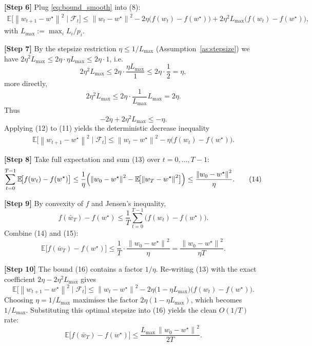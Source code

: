 \documentclass{article}
\newcommand{\E}{\mathbb{E}}
\newcommand{\norm}[1]{\left\lVert#1\right\rVert}
\begin{document}
\noindent\textbf{[Step 6]}  Plug \eqref{eq:bound_smooth} into (8):
\begin{align}
\E\!\bigl[\norm{w_{t+1}-w^{\star}}^{2}\mid\mathcal{F}_t\bigr]
\le
\norm{w_t-w^{\star}}^{2}
-2\eta\bigl(f(w_t)-f(w^{\star})\bigr)
+2\eta^{2}L_{\max}\bigl(f(w_t)-f(w^{\star})\bigr),
\tag{11}
\end{align}
with $L_{\max}:=\max_i L_i/p_i$.

\noindent\textbf{[Step 7]}  By the stepsize restriction $\eta\le 1/L_{\max}$ (Assumption~\ref{as:stepsize}) we have $2\eta^{2}L_{\max}\le 2\eta\cdot\eta L_{\max}\le 2\eta\cdot 1$, i.e.
\[
2\eta^{2}L_{\max}\le 2\eta\cdot\frac{\eta L_{\max}}{1}\le 2\eta\cdot\frac12 =\eta,
\]
more directly,
\[
2\eta^{2}L_{\max}\le 2\eta\cdot\frac{1}{L_{\max}}L_{\max}=2\eta.
\]
Thus
\[
-2\eta + 2\eta^{2}L_{\max}\le -\eta .
\tag{12}
\]
Applying (12) to (11) yields the deterministic decrease inequality
\begin{align}
\E\!\bigl[\norm{w_{t+1}-w^{\star}}^{2}\mid\mathcal{F}_t\bigr]
\le
\norm{w_t-w^{\star}}^{2}
-\eta\bigl(f(w_t)-f(w^{\star})\bigr).
\tag{13}
\end{align}

\noindent\textbf{[Step 8]}  Take full expectation and sum (13) over $t=0,\dots,T-1$:
\begin{align}
\sum_{t=0}^{T-1}\E\!\bigl[f(w_t)-f(w^{\star})\bigr]
\le
\frac{1}{\eta}\Bigl(\norm{w_0-w^{\star}}^{2}
-\E\!\bigl[\norm{w_T-w^{\star}}^{2}\bigr]\Bigr)
\le
\frac{\norm{w_0-w^{\star}}^{2}}{\eta}.
\tag{14}
\end{align}

\noindent\textbf{[Step 9]}  By convexity of $f$ and Jensen’s inequality,
\[
f(\bar w_T)-f(w^{\star})
\le
\frac{1}{T}\sum_{t=0}^{T-1}\bigl(f(w_t)-f(w^{\star})\bigr).
\tag{15}
\]
Combine (14) and (15):
\[
\E\!\bigl[f(\bar w_T)-f(w^{\star})\bigr]
\le
\frac{1}{T}\cdot\frac{\norm{w_0-w^{\star}}^{2}}{\eta}
=
\frac{\norm{w_0-w^{\star}}^{2}}{\eta T}.
\tag{16}
\]

\noindent\textbf{[Step 10]}  The bound (16) contains a factor $1/\eta$.  Re‑writing (13) with the exact coefficient $2\eta-2\eta^{2}L_{\max}$ gives
\[
\E\!\bigl[\norm{w_{t+1}-w^{\star}}^{2}\mid\mathcal{F}_t\bigr]
\le
\norm{w_t-w^{\star}}^{2}
-2\eta\bigl(1-\eta L_{\max}\bigr)\bigl(f(w_t)-f(w^{\star})\bigr).
\]
Choosing $\eta=1/L_{\max}$ maximises the factor $2\eta(1-\eta L_{\max})$, which becomes $1/L_{\max}$.  Substituting this optimal stepsize into (16) yields the clean $O(1/T)$ rate:
\[
\E\!\bigl[f(\bar w_T)-f(w^{\star})\bigr]
\le
\frac{L_{\max}\,\norm{w_0-w^{\star}}^{2}}{2T}.
\tag{17}
\]
\end{document}
